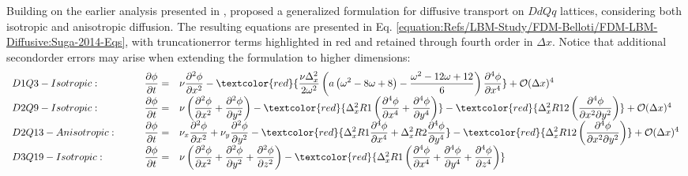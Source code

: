 \documentclass[letterpaper,10pt,english,openany,oneside]{jupyterBook}
\begin{document}
\sphinxAtStartPar
Building on the earlier analysis presented in ,  proposed a generalized formulation for diffusive transport on \(DdQq\) lattices, considering both isotropic and anisotropic diffusion. The resulting equations are presented in Eq. \eqref{equation:Refs/LBM-Study/FDM-Belloti/FDM-LBM-Diffusive:Suga-2014-Eqs}, with truncation\sphinxhyphen{}error terms highlighted in red and retained through fourth order in \(\Delta x\). Notice that additional second\sphinxhyphen{}order errors may arise when extending the formulation to higher dimensions:
\begin{equation}\label{equation:Refs/LBM-Study/FDM-Belloti/FDM-LBM-Diffusive:Suga-2014-Eqs}
\begin{split}
\begin{array}{lll}
D1Q3-Isotropic: \qquad & \displaystyle\frac{\partial\phi}{\partial t} = &\nu \displaystyle\frac{\partial^{2}\phi}{\partial x^{2}}  - \textcolor{red} {\frac{\nu\Delta_{x}^{2}}{2\omega^{2}}\left( a\left(\omega^{2} - 8 \omega + 8 \right)  - \frac{\omega^{2} - 12\omega + 12 }{6} \right) \frac{\partial^{4}\phi}{\partial x^{4}} } + \mathcal{O}(\Delta x)^{4}\\
D2Q9-Isotropic: \qquad & \displaystyle\frac{\partial\phi}{\partial t} = &\nu\left(\displaystyle\frac{\partial^{2}\phi}{\partial x^{2}} + \frac{\partial^{2}\phi}{\partial y^{2}}\right)  - \textcolor{red} { \Delta_{x}^{2} R1 \left( \displaystyle\frac{\partial^{4}\phi}{\partial x^{4}} + \frac{\partial^{4}\phi}{\partial y^{4}} \right) } - \textcolor{red} { \Delta_{x}^{2} R12 \left( \displaystyle\frac{\partial^{4}\phi}{\partial x^{2}\partial y^{2}} \right) } + \mathcal{O}(\Delta x)^{4}\\
D2Q13-Anisotropic: \qquad & \displaystyle\frac{\partial\phi}{\partial t} =& \nu_{x} \displaystyle\frac{\partial^{2}\phi}{\partial x^{2}} + \nu_{y}\frac{\partial^{2}\phi}{\partial y^{2}}  - \textcolor{red} { \Delta_{x}^{2} R1 \frac{\partial^{4}\phi}{\partial x^{4}} + \Delta_{x}^{2} R2\frac{\partial^{4}\phi}{\partial y^{4}}  } - \textcolor{red} { \Delta_{x}^{2} R12 \left( \frac{\partial^{4}\phi}{\partial x^{2}\partial y^{2}} \right) } + \mathcal{O}(\Delta x)^{4}\\
D3Q19-Isotropic: \qquad & \displaystyle\frac{\partial\phi}{\partial t} = &\nu\left(\displaystyle\frac{\partial^{2}\phi}{\partial x^{2}} + \frac{\partial^{2}\phi}{\partial y^{2}} + \frac{\partial^{2}\phi}{\partial z^{2}}\right)  - \textcolor{red} { \Delta_{x}^{2} R1 \left( \displaystyle \frac{\partial^{4}\phi}{\partial x^{4}} + \frac{\partial^{4}\phi}{\partial y^{4}} + \frac{\partial^{4}\phi}{\partial z^{4}} \right) } \\ 

\end{array}
\end{split}
\end{equation}
\end{document}
